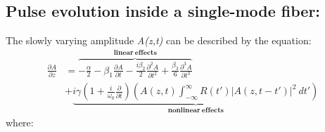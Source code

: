     \subsection{Pulse evolution inside a single-mode fiber:}
        The slowly varying amplitude \emph{A(z,t)} can be described by the equation:
        \begin{equation}\label{eq_a}
        \begin{split}
            \frac{\partial A}{\partial z}&= \overbrace{-\frac{\alpha}{2} - \beta_1\frac{\partial A}{\partial t} - \frac{i \beta_2}{2} \frac{\partial^2 A}{\partial t^2} +\frac{\beta_3}{6} \frac{\partial^3 A}{\partial t^3}}^{\mathbf{linear \ effects}}\\  
            & +\underbrace{i \gamma \left( 1 + \frac{i}{\omega_0} \frac{\partial}{\partial t} \right) \left( A(z,t) \int_{-\infty}^{\infty} R(t') \left|A(z, t-t') \right|^2 \ dt'  \right)}_{\mathbf{nonlinear \ effects}}
        \end{split}
        \end{equation}
    where: 
